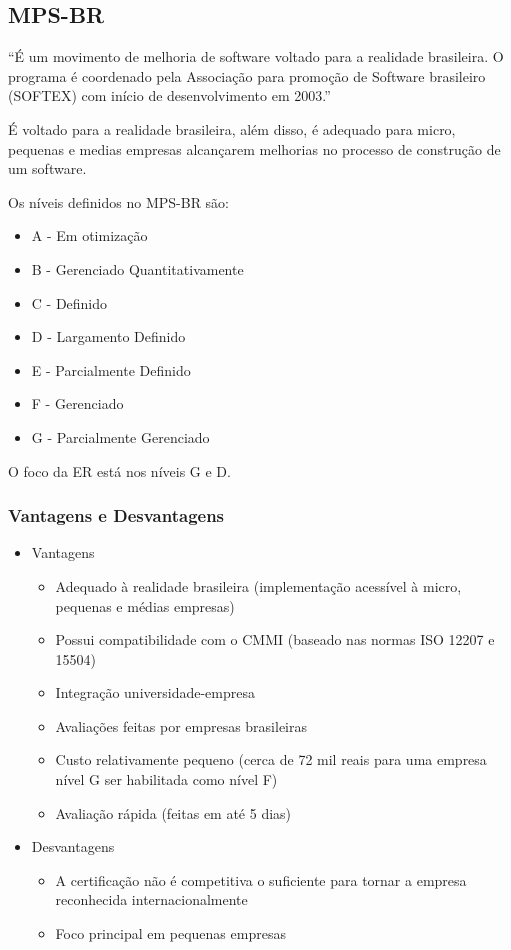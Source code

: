 \subsection{MPS-BR}

“É um movimento de melhoria de software voltado para a realidade brasileira. O programa é coordenado pela Associação para promoção de Software brasileiro (SOFTEX) com início de desenvolvimento em 2003.”

É voltado para a realidade brasileira, 	além disso, é adequado para micro, pequenas e medias empresas alcançarem melhorias no processo de construção de um software.

Os níveis definidos no MPS-BR são:

\begin{itemize}
	\item A - Em otimização
	\item B - Gerenciado Quantitativamente
	\item C - Definido
	\item D - Largamento Definido
	\item E - Parcialmente Definido
	\item F - Gerenciado
	\item G - Parcialmente Gerenciado
\end{itemize}

O foco da ER está nos níveis G e D.

\subsubsection{Vantagens e Desvantagens}

\begin{itemize}
	\item Vantagens
		\begin{itemize}
			\item Adequado à realidade brasileira (implementação acessível à micro, pequenas e médias empresas)
			\item Possui compatibilidade com o CMMI (baseado nas normas ISO 12207 e 15504)
			\item Integração universidade-empresa
			\item Avaliações feitas por empresas brasileiras
			\item Custo relativamente pequeno (cerca de 72 mil reais para uma empresa nível G ser habilitada como nível F)
			\item Avaliação rápida (feitas em até 5 dias)
		\end{itemize}
	\item Desvantagens
		\begin{itemize}
			\item A certificação não é competitiva o suficiente para tornar a empresa reconhecida internacionalmente
			\item Foco principal em pequenas empresas
		\end{itemize}
\end{itemize}

